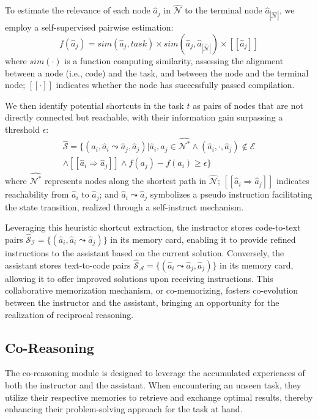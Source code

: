 \documentclass[11pt]{article}
\begin{document}
To estimate the relevance of each node \( \hat{a}_j \) in \( \hat{\mathcal{N}} \) to the terminal node \( \hat{a}_{|\hat{\mathcal{N}}|} \), we employ a self-supervised pairwise estimation:
\[
f(\hat{a}_j) = sim(\hat{a}_j, task) \times sim(\hat{a}_j, \hat{a}_{|\hat{\mathcal{N}}|}) \times [\![\hat{a}_j]\!]
\]
where \( sim(\cdot) \) is a function computing similarity, assessing the alignment between a node (i.e., code) and the task, and between the node and the terminal node; \( [\![\cdot]\!] \) indicates whether the node has successfully passed compilation.

We then identify potential shortcuts in the task \( t \) as pairs of nodes that are not directly connected but reachable, with their information gain surpassing a threshold \( \epsilon \):
\[
\begin{aligned}
\hat{\mathcal{S}} = \{ (\hat{a}_i, \hat{a}_i \leadsto \hat{a}_j, \hat{a}_j) | \hat{a}_i, \hat{a}_j \in \hat{\mathcal{N}^*} \wedge (\hat{a}_i, \cdot, \hat{a}_j) \notin \mathcal{E} \\ 
\wedge [\![ \hat{a}_i \Rightarrow \hat{a}_j ]\!] \wedge f(a_j) - f(a_i) \geq \epsilon \}
\end{aligned}
\]
where \( \hat{\mathcal{N}^*} \) represents nodes along the shortest path in \( \hat{\mathcal{N}} \); \( [\![ \hat{a}_i \Rightarrow \hat{a}_j ]\!] \) indicates reachability from \( \hat{a}_i \) to \( \hat{a}_j \); and \( \hat{a}_i \leadsto \hat{a}_j \) symbolizes a pseudo instruction facilitating the state transition, realized through a self-instruct mechanism.

Leveraging this heuristic shortcut extraction, the instructor stores code-to-text pairs \( \hat{\mathcal{S}}_\mathcal{I} = \{(\hat{a}_i, \hat{a}_i \leadsto \hat{a}_j)\} \) in its memory card, enabling it to provide refined instructions to the assistant based on the current solution. Conversely, the assistant stores text-to-code pairs \( \hat{\mathcal{S}}_\mathcal{A} = \{(\hat{a}_i \leadsto \hat{a}_j, \hat{a}_j)\} \) in its memory card, allowing it to offer improved solutions upon receiving instructions. This collaborative memorization mechanism, or co-memorizing, fosters co-evolution between the instructor and the assistant, bringing an opportunity for the realization of reciprocal reasoning.


\subsection{Co-Reasoning}
The co-reasoning module is designed to leverage the accumulated experiences of both the instructor and the assistant. When encountering an unseen task, they utilize their respective memories to retrieve and exchange optimal results, thereby enhancing their problem-solving approach for the task at hand.
\end{document}
